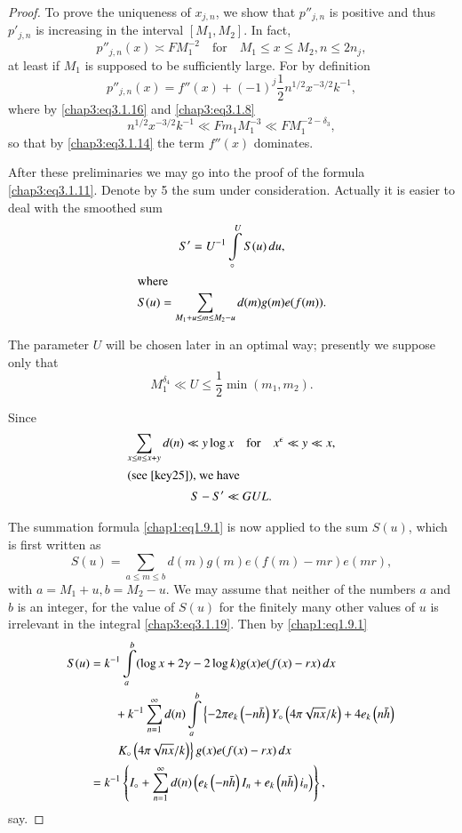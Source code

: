 \begin{proof}
To prove the uniqueness of $x_{j,n}$, we show that $p''_{j,n}$ is
positive and thus $p'_{j,n}$ is increasing in the interval
$[M_1,M_2]$. In fact, 
\begin{equation}\label{chap3:eq3.1.18}
p''_{j,n}(x)\asymp FM_1^{-2}\quad\text{for}\quad M_1\leq x\leq M_2,
n\leq 2n_j,
\end{equation}
at least if $M_1$ is supposed to be sufficiently large. For by
definition 
$$
p''_{j,n}(x)=f''(x)+(-1)^j\frac{1}{2}n^{1/2}x^{-3/2}k^{-1},
$$
where by \eqref{chap3:eq3.1.16} and \eqref{chap3:eq3.1.8}
$$
n^{1/2}x^{-3/2}k^{-1}\ll Fm_1M_1^{-3}\ll FM_1^{-2-\delta_3},
$$\pageoriginale
so that by \eqref{chap3:eq3.1.14} the term $f''(x)$ dominates.

After these preliminaries we may go into the proof of the formula
\eqref{chap3:eq3.1.11}. Denote by 5 the sum under
consideration. Actually it is easier to deal with the smoothed sum 
\begin{gather}
S'=U^{-1}\int\limits_\circ^US(u)\,du,\label{chap3:eq3.1.19}\\
\intertext{where}
S(u)=\sum\limits_{M_1+u\leq m\leq M_2-u}d(m)g(m)e(f
(m)).\label{chap3:eq3.1.20} 
\end{gather}

The parameter $U$ will be chosen later in an optimal way; presently we
suppose only that 
\begin{equation}\label{chap3:eq3.1.21}
M_1^{\delta_4}\ll U\leq\frac{1}{2}\min\left(m_1,m_2\right). 
\end{equation}

Since
\begin{gather}
\sum\limits_{x\leq n\leq x+y}d(n)\ll y\log x\quad\text{for}\quad x^\epsilon
\ll y\ll x,\label{chap3:eq3.1.22}\\
\intertext{(see \cite{key25}), we have}
S-S'\ll GUL.\label{chap3:eq3.1.23}
\end{gather}

The summation formula \eqref{chap1:eq1.9.1} is now applied to the sum
$S(u)$, which is first written as 
$$
S(u)=\sum\limits_{a\leq m\leq b}d(m)g(m)e(f(m)-mr)e(mr),
$$
with $a=M_1+u, b=M_2-u$. We may assume that neither of the numbers $a$
and $b$ is an integer, for the value of $S(u)$ for the finitely many
other values of $u$ is irrelevant in the integral
\eqref{chap3:eq3.1.19}. Then by \eqref{chap1:eq1.9.1}
\begin{align}
S(u) &= k^{-1}\int\limits_a^b(\log x+2\gamma-2\log k)g(x)e(f(x)-rx)
\,dx\label{chap3:eq3.1.24}\\ 
&\qquad +k^{-1}\sum\limits_{n=1}^\infty d(n)\int\limits_a^b\left\{
-2\pi e_k\left(-n\bar{h}\right)Y_\circ\left(4\pi\sqrt{nx}/k\right)+4
e_k\left(n\bar{h}\right)\right.\notag\\
&\qquad \left. K_\circ\left(4\pi\sqrt{nx}/k\right)\right\}
g(x)e(f(x)-rx)\,dx\notag\\
&= k^{-1}\left\{I_\circ+\sum\limits_{n=1}^\infty d(n)\left(e_k\left(-n
\bar{h}\right)I_n+e_k\left(n\bar{h}\right)i_n\right)\right\},\notag
\end{align}\pageoriginale
say.


\end{proof}
